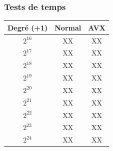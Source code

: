\documentclass[12pt, a4paper]{article}
\begin{document}
\subsubsection{Tests de temps}
\begin{center}
\begin{tabular}{||c c c||}
\hline
Degré (+1) & Normal & AVX \\
\hline\hline
$2^{16}$ & XX & XX \\
\hline
$2^{17}$ & XX & XX \\
\hline
$2^{18}$ & XX & XX \\
\hline
$2^{19}$ & XX & XX \\
\hline
$2^{20}$ & XX & XX \\
\hline
$2^{21}$ & XX & XX \\
\hline
$2^{22}$ & XX & XX \\
\hline
$2^{23}$ & XX & XX \\
\hline
$2^{24}$ & XX & XX \\
\hline
\end{tabular}
\end{center}
\end{document}

